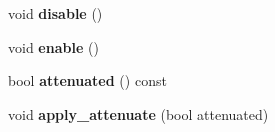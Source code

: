 \begin{DoxyCompactItemize}
\item 
void {\bfseries disable} ()\hypertarget{classGFXLight_a0892a9f2586fc8a0f0e161a901c2c474}{}\label{classGFXLight_a0892a9f2586fc8a0f0e161a901c2c474}

\item 
void {\bfseries enable} ()\hypertarget{classGFXLight_aa87d0d648313c5e4acac94f5217c698b}{}\label{classGFXLight_aa87d0d648313c5e4acac94f5217c698b}

\item 
bool {\bfseries attenuated} () const \hypertarget{classGFXLight_af6552bf56ab40bc07c1b745de243556e}{}\label{classGFXLight_af6552bf56ab40bc07c1b745de243556e}

\item 
void {\bfseries apply\+\_\+attenuate} (bool attenuated)\hypertarget{classGFXLight_a25d9b6576e5a2326592c17906ae74c87}{}\label{classGFXLight_a25d9b6576e5a2326592c17906ae74c87}

\end{DoxyCompactItemize}

